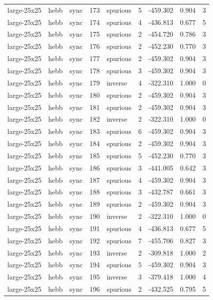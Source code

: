 \begin{tabular}{lllrlrrrr}
large-25x25 & hebb & sync & 173 & spurious & 5 & -459.302 & 0.904 & 3 \\
large-25x25 & hebb & sync & 174 & spurious & 4 & -436.813 & 0.677 & 5 \\
large-25x25 & hebb & sync & 175 & spurious & 2 & -454.720 & 0.786 & 3 \\
large-25x25 & hebb & sync & 176 & spurious & 2 & -452.230 & 0.770 & 3 \\
large-25x25 & hebb & sync & 177 & spurious & 2 & -459.302 & 0.904 & 3 \\
large-25x25 & hebb & sync & 178 & spurious & 3 & -459.302 & 0.904 & 3 \\
large-25x25 & hebb & sync & 179 & inverse & 4 & -322.310 & 1.000 & 0 \\
large-25x25 & hebb & sync & 180 & spurious & 2 & -459.302 & 0.904 & 3 \\
large-25x25 & hebb & sync & 181 & spurious & 2 & -459.302 & 0.904 & 3 \\
large-25x25 & hebb & sync & 182 & inverse & 2 & -322.310 & 1.000 & 0 \\
large-25x25 & hebb & sync & 183 & spurious & 6 & -459.302 & 0.904 & 3 \\
large-25x25 & hebb & sync & 184 & spurious & 2 & -459.302 & 0.904 & 3 \\
large-25x25 & hebb & sync & 185 & spurious & 5 & -452.230 & 0.770 & 3 \\
large-25x25 & hebb & sync & 186 & spurious & 3 & -441.005 & 0.642 & 3 \\
large-25x25 & hebb & sync & 187 & spurious & 4 & -459.302 & 0.904 & 3 \\
large-25x25 & hebb & sync & 188 & spurious & 3 & -432.787 & 0.661 & 3 \\
large-25x25 & hebb & sync & 189 & spurious & 2 & -459.302 & 0.904 & 3 \\
large-25x25 & hebb & sync & 190 & inverse & 2 & -322.310 & 1.000 & 0 \\
large-25x25 & hebb & sync & 191 & spurious & 4 & -436.813 & 0.677 & 5 \\
large-25x25 & hebb & sync & 192 & spurious & 7 & -455.706 & 0.827 & 3 \\
large-25x25 & hebb & sync & 193 & inverse & 2 & -309.818 & 1.000 & 2 \\
large-25x25 & hebb & sync & 194 & spurious & 5 & -459.302 & 0.904 & 3 \\
large-25x25 & hebb & sync & 195 & inverse & 3 & -379.418 & 1.000 & 4 \\
large-25x25 & hebb & sync & 196 & spurious & 2 & -432.525 & 0.795 & 5 \\

\end{tabular}
